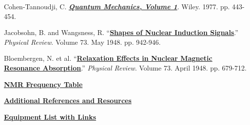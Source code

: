\documentclass{../lab}
\begin{document}
\begin{thebibliography}{}
     Cohen-Tannoudji, C. \href{https://drive.google.com/file/d/17uKOxmZpWMTCwG87ZlicR9jNIds2v97v/view?usp=drive_link}{\textbf{\emph{Quantum Mechanics, Volume 1}}}. Wiley. 1977. pp. 443-454.

     Jacobsohn, B. and Wangsness, R. ``\href{https://drive.google.com/file/d/1J4Uv9tINhLTobJtgihbU2f6oAbGIF4uF/view?usp=drive_link}{\textbf{Shapes of Nuclear Induction Signals}}.'' \emph{Physical Review}. Volume 73. May 1948. pp. 942-946.

     Bloembergen, N. et al. ``\href{https://drive.google.com/file/d/1HnVNfdFe30iwh7UIdQqg2Q2i419LP9Ar/view?usp=drive_link}{\textbf{Relaxation Effects in Nuclear Magnetic Resonance Absorption}}.'' \emph{Physical Review}. Volume 73. April 1948. pp. 679-712.

     \href{https://berkeley-physics111b.github.io/assets/pdf/oldwebsitestructure/images/NMR32.jpg}{\textbf{NMR Frequency Table}}

    \href{https://drive.google.com/file/d/1Lg6w9r_2TonOpshDvo3Lra_y9p8qkc-t/view?usp=drive_link} {\textbf{Additional References and Resources}}

        \href{https://drive.google.com/file/d/1e0ir52sX3di0DJyAeb5uBPybmgBzXpxn/view?usp=drive_link} {\textbf{Equipment List with Links}}

\end{thebibliography}
\end{document}
